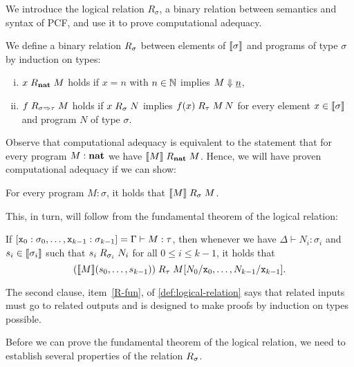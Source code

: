 We introduce the logical relation \(R_\sigma\), a binary relation between
semantics and syntax of PCF, and use it to prove computational adequacy.

\begin{definition}\label{def:logical-relation}
  We define a binary relation \(\mathrel{R}_\sigma\) between elements of
  \(\llbracket\sigma\rrbracket\) and programs of type \(\sigma\) by induction on types:
  \begin{enumerate}[(i)]
  \item\label{R-nat} \({x \mathrel{R}_{\mathtt{\mathbf{nat}}} M}\) holds if \(x = n\) with
    \(n \in \mathbb N\) implies \(M \Downarrow \underline{n}\),
  \item\label{R-fun} \(f \mathrel{R}_{\sigma \Rightarrow \tau} M\) holds if \(x \mathrel{R}_\sigma N\)
    implies \({f(x)} \mathrel{R}_\tau {M \, N}\) for every element
    \(x \in \llbracket\sigma\rrbracket\) and program \(N\) of type \(\sigma\). \qedhere
  \end{enumerate}
\end{definition}

Observe that computational adequacy is equivalent to the statement that for
every program \(M : \mathtt{\mathbf{nat}}\) we have \(\llbracket M\rrbracket \mathrel{R}_\mathtt{\mathbf{nat}} M\).
%
Hence, we will have proven computational adequacy if we can show:

\begin{lemma*}
  For every program \(M : \sigma\), it holds that \(\llbracket M\rrbracket \mathrel{R}_\sigma M\).
\end{lemma*}

This, in turn, will follow from the fundamental theorem of the logical relation:

\begin{lemma*}\label{fundamental-theorem}
  If
  \([\mathtt x_0 : \sigma_0 , \dots , \mathtt x_{k-1} : \sigma_{k-1}] = \Gamma \vdash
  M : \tau\), then whenever we have \(\Delta \vdash N_i : \sigma_i\) and
  \(s_i \in \llbracket\sigma_i\rrbracket\) such that \(s_i \mathrel{R}_{\sigma_i} N_i\) for
  all \(0 \leq i \leq k-1\), it holds that
  \[
    \pa*{\densem{M}\pa*{s_0,\dots,s_{k-1}}} \logrel_{\tau} {M[N_0/\var x_0,\dots,N_{k-1}/\var x_{k-1}]}.
  \]
\end{lemma*}

The second clause, item~\ref{R-fun}, of \cref{def:logical-relation} says that
related inputs must go to related outputs and is designed to make proofs by
induction on types possible.

Before we can prove the fundamental theorem of the logical relation, we need to
establish several properties of the relation \(\mathrel{R}_\sigma\).


